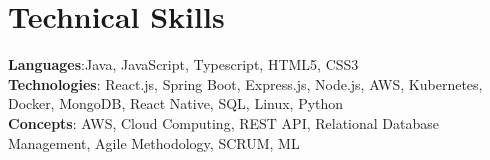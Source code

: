 \section{Technical Skills}
    \begin{itemize}[leftmargin=0.15in, label={}]
	\small{\item{
		\textbf{Languages}{:Java, JavaScript, Typescript, HTML5, CSS3} \\
		\textbf{Technologies}{: React.js, Spring Boot, Express.js, Node.js, AWS, Kubernetes, Docker, MongoDB, React Native, SQL, Linux, Python} \\
		\textbf{Concepts}{: AWS,  Cloud Computing, REST API, Relational Database Management, Agile Methodology, SCRUM, ML }
	}}
    \end{itemize}